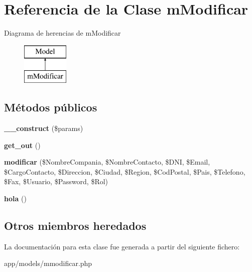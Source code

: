 \hypertarget{classm_modificar}{}\section{Referencia de la Clase m\+Modificar}
\label{classm_modificar}
Diagrama de herencias de m\+Modificar\begin{figure}[H]
\begin{center}
\leavevmode
\includegraphics[height=2.000000cm]{classm_modificar}
\end{center}
\end{figure}
\subsection*{Métodos públicos}
\begin{DoxyCompactItemize}
\item 
\hypertarget{classm_modificar_a9162320adff1a1a4afd7f2372f753a3e}{}{\bfseries \+\_\+\+\_\+construct} (\$params)\label{classm_modificar_a9162320adff1a1a4afd7f2372f753a3e}

\item 
\hypertarget{classm_modificar_aa67567dc404200190a6abcae9262dba0}{}{\bfseries get\+\_\+out} ()\label{classm_modificar_aa67567dc404200190a6abcae9262dba0}

\item 
\hypertarget{classm_modificar_a3511064d552e515d53fbdf50fee29b6e}{}{\bfseries modificar} (\$Nombre\+Compania, \$Nombre\+Contacto, \$D\+N\+I, \$Email, \$Cargo\+Contacto, \$Direccion, \$Ciudad, \$Region, \$Cod\+Postal, \$Pais, \$Telefono, \$Fax, \$Usuario, \$Password, \$Rol)\label{classm_modificar_a3511064d552e515d53fbdf50fee29b6e}

\item 
\hypertarget{classm_modificar_a3f1df2d57246e91220a6a6e53c0f3e35}{}{\bfseries hola} ()\label{classm_modificar_a3f1df2d57246e91220a6a6e53c0f3e35}

\end{DoxyCompactItemize}
\subsection*{Otros miembros heredados}


La documentación para esta clase fue generada a partir del siguiente fichero\+:\begin{DoxyCompactItemize}
\item 
app/models/mmodificar.\+php\end{DoxyCompactItemize}
